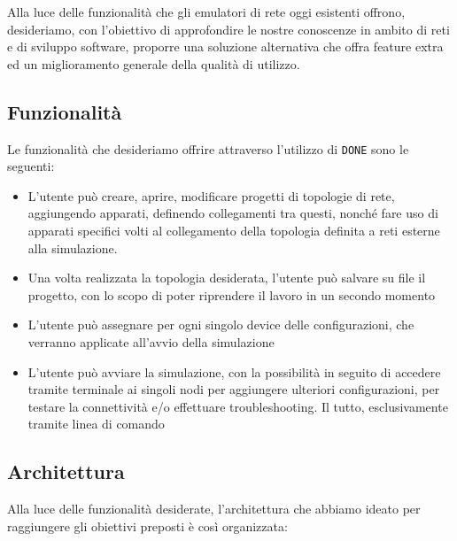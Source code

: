 Alla luce delle funzionalità che gli emulatori di rete oggi esistenti offrono, desideriamo, con l'obiettivo di approfondire le nostre conoscenze in ambito di reti e di sviluppo software, proporre una soluzione alternativa che offra feature extra ed un miglioramento generale della qualità di utilizzo.
\subsection{Funzionalità}
Le funzionalità che desideriamo offrire attraverso l'utilizzo di \texttt{DONE} sono le seguenti: 
\begin{itemize}
    \item L'utente può creare, aprire, modificare progetti di topologie di rete, aggiungendo apparati, definendo collegamenti tra questi, nonché fare uso di apparati specifici volti al collegamento della topologia definita a reti esterne alla simulazione. 
    \item Una volta realizzata la topologia desiderata, l'utente può salvare su file il progetto, con lo scopo di poter riprendere il lavoro in un secondo momento
    \item L'utente può assegnare per ogni singolo device delle configurazioni, che verranno applicate all'avvio della simulazione
    \item L'utente può avviare la simulazione, con la possibilità in seguito di accedere tramite terminale ai singoli nodi per aggiungere ulteriori configurazioni, per testare la connettività e/o effettuare troubleshooting. Il tutto, esclusivamente tramite linea di comando
\end{itemize}
\subsection{Architettura}
Alla luce delle funzionalità desiderate, l'architettura che abbiamo ideato per raggiungere gli obiettivi preposti è così organizzata: 
\begin{center}
\end{center}

